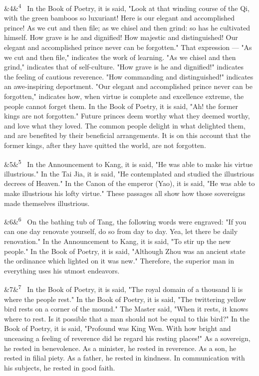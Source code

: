 \documentclass[12pt]{article}
\newcommand{\para}[1][]{\par\noindent\ifx&#1&\else\textsuperscript{\footnotesize #1}~\fi}
\begin{document}
\para[4] In the Book of Poetry, it is said, "Look at that winding course of the Qi, with the green bamboos so luxuriant! Here is our elegant and accomplished prince! As we cut and then file; as we chisel and then grind: so has he cultivated himself. How grave is he and dignified! How majestic and distinguished! Our elegant and accomplished prince never can be forgotten." That expression --- "As we cut and then file," indicates the work of learning. "As we chisel and then grind," indicates that of self-culture. "How grave is he and dignified!" indicates the feeling of cautious reverence. "How commanding and distinguished!" indicates an awe-inspiring deportment. "Our elegant and accomplished prince never can be forgotten," indicates how, when virtue is complete and excellence extreme, the people cannot forget them. In the Book of Poetry, it is said, "Ah! the former kings are not forgotten." Future princes deem worthy what they deemed worthy, and love what they loved. The common people delight in what delighted them, and are benefited by their beneficial arrangements. It is on this account that the former kings, after they have quitted the world, are not forgotten.

\para[5] In the Announcement to Kang, it is said, "He was able to make his virtue illustrious." In the Tai Jia, it is said, "He contemplated and studied the illustrious decrees of Heaven." In the Canon of the emperor (Yao), it is said, "He was able to make illustrious his lofty virtue." These passages all show how those sovereigns made themselves illustrious.

\para[6] On the bathing tub of Tang, the following words were engraved: "If you can one day renovate yourself, do so from day to day. Yea, let there be daily renovation." In the Announcement to Kang, it is said, "To stir up the new people." In the Book of Poetry, it is said, "Although Zhou was an ancient state the ordinance which lighted on it was new." Therefore, the superior man in everything uses his utmost endeavors.

\para[7] In the Book of Poetry, it is said, "The royal domain of a thousand li is where the people rest." In the Book of Poetry, it is said, "The twittering yellow bird rests on a corner of the mound." The Master said, "When it rests, it knows where to rest. Is it possible that a man should not be equal to this bird?" In the Book of Poetry, it is said, "Profound was King Wen. With how bright and unceasing a feeling of reverence did he regard his resting places!" As a sovereign, he rested in benevolence. As a minister, he rested in reverence. As a son, he rested in filial piety. As a father, he rested in kindness. In communication with his subjects, he rested in good faith.
\end{document}
